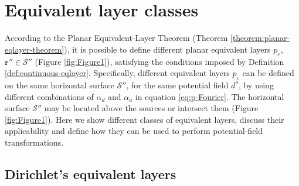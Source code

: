 \section{Equivalent layer classes}
\label{sec:eqlayer_classes}

According to the Planar Equivalent-Layer Theorem (Theorem \ref{theorem:planar-eqlayer-theorem}), 
it is possible to define different planar equivalent layers $p_{\varepsilon}$, 
$\mathbf{r}'' \in \mathcal{S}''$ (Figure \ref{fig:Figure1}), 
satisfying the conditions imposed by Definition \ref{def:continuous-eqlayer}.
Specifically, different equivalent layers $p_{\varepsilon}$ can be defined
on the same horizontal surface $\mathcal{S}''$, for the same potential field $d^{o}$, 
by using different combinations of $\alpha_{d}$ and $\alpha_{a}$ in equation \ref{eq:p-Fourier}. 
The horizontal surface $\mathcal{S}''$ may be located above the sources 
or intersect them (Figure \ref{fig:Figure1}).
Here we show different classes of equivalent layers, discuss their applicability and define how they 
can be used to perform potential-field transformations.

\subsection{Dirichlet's equivalent layers}

